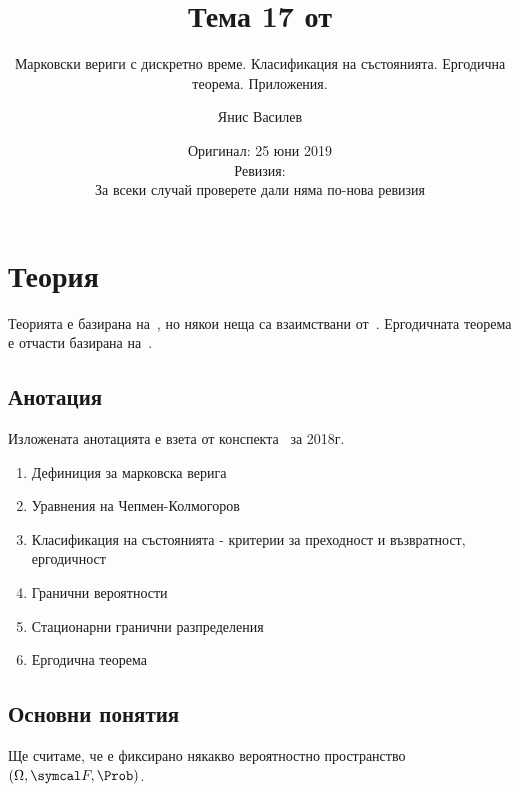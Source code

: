 \documentclass[numbers=endperiod, bibliography=totocnumbered]{scrartcl}
\title{Тема 17 от \URL{https://github.com/v--/se2018}}
\subtitle{Марковски вериги с дискретно време. Класификация на състоянията. Ергодична теорема. Приложения.}
\author{Янис Василев}
\date{Оригинал: 25 юни 2019 \\ Ревизия:  \\ За всеки случай проверете дали няма по-нова ревизия}
\begin{document}
\maketitle

\section{Теория}

Теорията е базирана на~\cite{Lectures}, но някои неща са взаимствани от~\cite{Borovkov}. Ергодичната теорема е отчасти базирана на~\cite{Ergodic}.

\subsection{Анотация}

Изложената анотацията е взета от конспекта~\cite{Syllabus} за 2018г.

\begin{enumerate}
  \item Дефиниция за марковска верига
  \item Уравнения на Чепмен-Колмогоров
  \item Класификация на състоянията - критерии за преходност и възвратност, ергодичност
  \item Гранични вероятности
  \item Стационарни гранични разпределения
  \item Ергодична теорема
\end{enumerate}

\subsection{Основни понятия}

Ще считаме, че е фиксирано някакво вероятностно пространство \( (\Omega, \F, \Prob) \).
\end{document}
